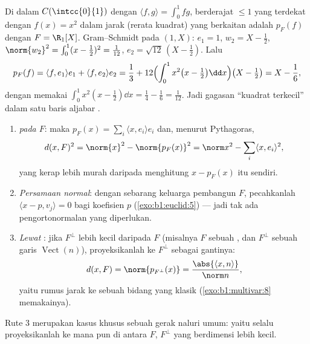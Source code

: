 \begin{example}\label{ex:b1:euclid:bestapprox}
Di dalam $C(\intcc{0}{1})$ dengan $\langle f, g\rangle = \int_0^1 fg$,
 berderajat $\leq 1$ yang terdekat dengan $f(x) = x^2$ dalam
jarak (rerata kuadrat) yang berkaitan adalah $p_F(f)$ dengan $F = \R_1[X]$.
Gram--Schmidt pada $(1, X)$: $e_1 = 1$, $w_2 = X - \frac12$,
$\norm{w_2}^2 = \int_0^1 (x - \frac12)^2 = \frac{1}{12}$, $e_2 =
\sqrt{12}\,(X - \tfrac12)$. Lalu
\[
p_F(f) = \langle f, e_1\rangle e_1 + \langle f, e_2\rangle e_2
= \frac13 + 12\Bigl(\int_0^1 x^2\bigl(x - \tfrac12\bigr)\dd
x\Bigr)\bigl(X - \tfrac12\bigr)
= X - \frac{1}{6},
\]
dengan memakai $\int_0^1 x^2(x - \frac12)\dd x = \frac14 - \frac16 =
\frac{1}{12}$. Jadi gagasan ``kuadrat terkecil'' dalam satu baris aljabar
.
\end{example}

\begin{method}
\label{met:b1:euclid:distance}
\begin{enumerate}
  \item \emph{  pada $F$}: maka $p_F(x) = \sum_i
        \langle x, e_i\rangle e_i$ dan, menurut Pythagoras,
        \[
        d(x, F)^2 = \norm{x}^2 - \norm{p_F(x)}^2
        = \norm x^2 - \sum_i \langle x, e_i\rangle^2 ,
        \]
        yang kerap lebih murah daripada menghitung $x - p_F(x)$ itu sendiri.
  \item \emph{Persamaan normal}: dengan sebarang keluarga pembangun
        $F$, pecahkanlah $\langle x - p, v_j\rangle = 0$ bagi
        koefisien $p$ (\cref{exo:b1:euclid:5}) --- jadi tak ada
        pengortonormalan yang diperlukan.
  \item \emph{Lewat }: jika $F^\perp$ lebih kecil
        daripada $F$ (misalnya $F$ sebuah , dan $F^\perp$ sebuah garis
        $\operatorname{Vect}(n)$), proyeksikanlah ke $F^\perp$
        sebagai gantinya:
        \[
        d(x, F) = \norm{p_{F^\perp}(x)} =
        \frac{\abs{\langle x, n\rangle}}{\norm n} ,
        \]
        yaitu rumus jarak ke sebuah bidang yang klasik
        (\cref{exo:b1:multivar:8} memakainya).
\end{enumerate}
Rute 3 merupakan kasus khusus sebuah gerak naluri umum: yaitu selalu proyeksikanlah
ke mana pun di antara $F$, $F^\perp$ yang berdimensi lebih kecil.
\end{method}

